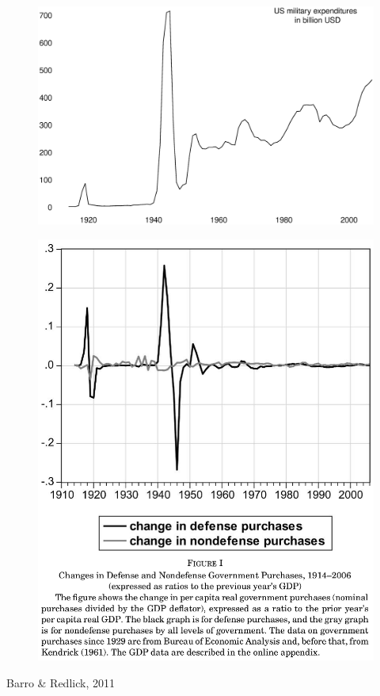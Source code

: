 \documentclass{beamer}
\begin{document}
\begin{frame}
  \begin{figure}
    \includegraphics[scale=.3]{us_milexp.eps}
  \end{figure}
\end{frame}

\begin{frame}
  \begin{figure}
    \includegraphics[scale=.5]{barro_redlick1.eps}
  \end{figure}
  Barro \& Redlick, 2011
\end{frame}
\end{document}
